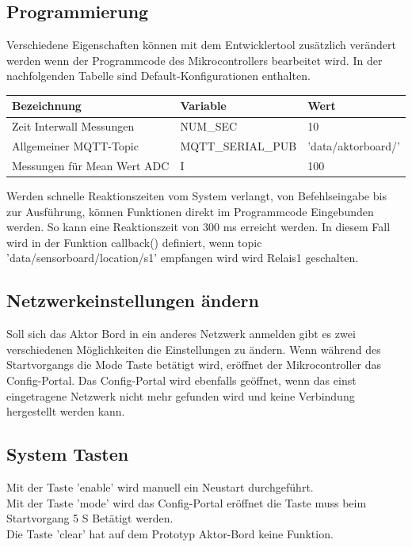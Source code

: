 \subsection{Programmierung}
Verschiedene Eigenschaften können mit dem Entwicklertool zusätzlich verändert werden wenn der Programmcode des Mikrocontrollers bearbeitet wird. In der nachfolgenden Tabelle sind Default-Konfigurationen enthalten.
\begin{table}[H]
\centering
\begin{tabular}{|l|l|l|}
	\hline 
	Bezeichnung & Variable & Wert \\ 
	\hline 
	Zeit Interwall Messungen & NUM\_SEC & 10 \\ 
	\hline 
	Allgemeiner MQTT-Topic  & MQTT\_SERIAL\_PUB & 'data/aktorboard/' \\ 
	\hline 
	Messungen für Mean Wert ADC & I & 100 \\ 
	\hline  
\end{tabular} 	
\end{table}
Werden schnelle Reaktionszeiten vom System verlangt, von Befehlseingabe bis zur Ausführung, können Funktionen direkt im Programmcode Eingebunden werden. So kann eine Reaktionszeit von 300 ms erreicht werden. In diesem Fall wird in der Funktion callback() definiert, wenn topic 'data/sensorboard/location/s1' empfangen wird wird Relais1 geschalten.
\subsection{Netzwerkeinstellungen ändern}
Soll sich das Aktor Bord in ein anderes Netzwerk anmelden gibt es zwei verschiedenen Möglichkeiten die Einstellungen zu ändern. Wenn während des Startvorgangs die Mode Taste betätigt wird, eröffnet der Mikrocontroller das Config-Portal. Das Config-Portal wird ebenfalls geöffnet, wenn das einst eingetragene Netzwerk nicht mehr gefunden wird und keine Verbindung hergestellt werden kann.
\subsection{System Tasten}
Mit der Taste 'enable' wird manuell ein Neustart durchgeführt. \\
Mit der Taste 'mode' wird das Config-Portal eröffnet die Taste muss beim Startvorgang 5 S Betätigt werden.\\
Die Taste 'clear' hat auf dem Prototyp Aktor-Bord keine Funktion.

